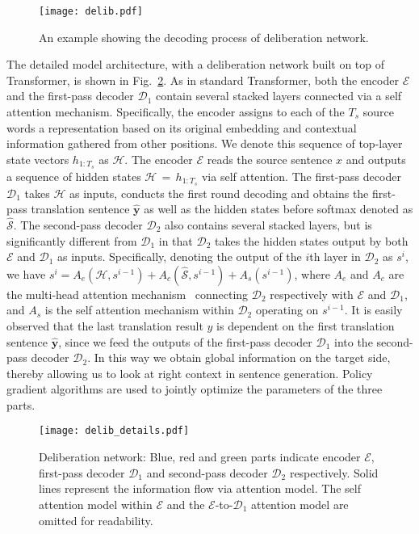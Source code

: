 \documentclass[a4paper]{article}
\begin{document}
\begin{CJK*}{UTF8}{gbsn}
\begin{figure}[!htpb]
                \centering
                \texttt{[image: delib.pdf]}
                \caption{An example showing the decoding process of deliberation network.}
                \label{fig:delib}
\end{figure}

The detailed model architecture, with a deliberation network built on top of Transformer, is shown in Fig.~\ref{fig:delib_detail}. As in standard Transformer, both the encoder $\mathcal{E}$ and the first-pass decoder $\mathcal{D}_1$ contain several stacked layers connected via a self attention mechanism.
Specifically, the encoder assigns to each of the $T_s$ source words a representation based on its original embedding and contextual information gathered from other positions. We denote this sequence of top-layer state vectors $h_{1:T_s}$ as $\mathcal{H}$.
The encoder $\mathcal{E}$ reads the source sentence $x$ and outputs a sequence of hidden states $\mathcal{H}\,=\,h_{1: T_s}$ via self attention. The first-pass decoder $\mathcal{D}_1$ takes $\mathcal{H}$ as inputs, conducts the first round decoding and obtains the first-pass translation sentence $\hat{\mathbf{y}}$ as well as the hidden states before softmax denoted as $\hat{\mathcal{S}}$. The second-pass decoder $\mathcal{D}_2$ also contains several stacked layers, but is significantly different from $\mathcal{D}_1$ in that $\mathcal{D}_2$ takes the hidden states output by both $\mathcal{E}$ and $\mathcal{D}_1$ as inputs. Specifically, denoting the output of the $i$th layer in $\mathcal{D}_2$ as $s^i$, we have $s^i=A_e(\mathcal{H}, s^{i-1})+A_c(\hat{\mathcal{S}},s^{i-1}) + A_s(s^{i-1})$, where $A_e$ and $A_c$ are the multi-head attention mechanism~\cite{vaswani2017attention} connecting $\mathcal{D}_2$ respectively with $\mathcal{E}$ and $\mathcal{D}_1$, and $A_s$ is the self attention mechanism within $\mathcal{D}_2$ operating on $s^{i-1}$. It is easily observed that the last translation result $y$ is dependent on the first translation sentence $\hat{\mathbf{y}}$, since we feed the outputs of the first-pass decoder $\mathcal{D}_1$ into the second-pass decoder $\mathcal{D}_2$. In this way we obtain global information on the target side, thereby allowing us to look at right context in sentence generation. Policy gradient algorithms are used to jointly optimize the parameters of the three parts.

\begin{figure}[!htpb]
	\centering
	\texttt{[image: delib\_details.pdf]}
	\caption{Deliberation network: Blue, red and green parts indicate encoder $\mathcal{E}$, first-pass decoder $\mathcal{D}_1$ and second-pass decoder $\mathcal{D}_2$ respectively. Solid lines represent the information flow via attention model. The self attention model within $\mathcal{E}$ and the $\mathcal{E}$-to-$\mathcal{D}_1$ attention model are omitted for readability.}
	\label{fig:delib_detail}
\end{figure}


\end{CJK*}
\end{document}
